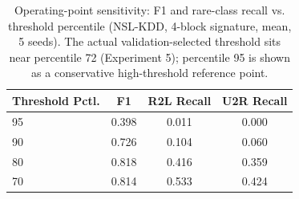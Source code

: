 \begin{table}[t]
\centering
\caption{Operating-point sensitivity: F1 and rare-class recall vs. threshold percentile (NSL-KDD, 4-block signature, mean, 5 seeds). The actual validation-selected threshold sits near percentile 72 (Experiment 5); percentile 95 is shown as a conservative high-threshold reference point.}
\label{tab:operating_point}
\begin{tabular}{lccc}
\toprule
Threshold Pctl. & F1 & R2L Recall & U2R Recall \\
\midrule
95 & 0.398 & 0.011 & 0.000 \\
90 & 0.726 & 0.104 & 0.060 \\
80 & 0.818 & 0.416 & 0.359 \\
70 & 0.814 & 0.533 & 0.424 \\
\bottomrule
\end{tabular}
\end{table}